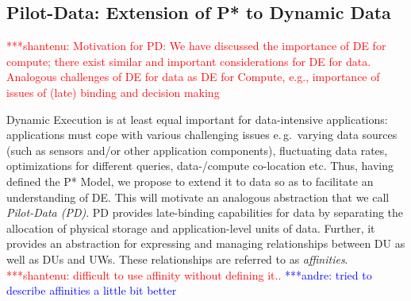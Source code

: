 \documentclass[conference,final]{IEEEtran}
\newcommand{\jhanote}[1]{ {\textcolor{red} { ***shantenu: #1 }}}
\newcommand{\alnote}[1]{ {\textcolor{blue} { ***andre: #1 }}}
\newcommand{\alnote}[1]{}
\newcommand{\jhanote}[1]{}
\begin{document}
\subsection{Pilot-Data: Extension of P* to Dynamic Data}
\label{sec:pilot-data}







\jhanote{Motivation for PD: We have discussed the importance of DE for
  compute; there exist similar and important considerations for DE for
  data. Analogous challenges of DE for data as DE for Compute, e.g.,
  importance of issues of (late) binding and decision making} 

Dynamic Execution is at least equal important for data-intensive applications:
applications must cope with various challenging issues e.\,g.\ varying data
sources (such as sensors and/or other application components), fluctuating data
rates, optimizations for different queries, data-/compute co-location etc. Thus,
having defined the P* Model, we propose to extend it to data so as to facilitate
an understanding of DE. This will motivate an analogous abstraction that we call
\emph{Pilot-Data (PD)}. PD provides late-binding capabilities for data by
separating the allocation of physical storage and application-level units of
data. Further, it provides an abstraction for expressing and managing
relationships between DU as well as DUs and UWs. These relationships are
referred to as
\emph{affinities}.
\jhanote{difficult to use affinity
  without defining it..}
\alnote{tried to describe affinities a little bit better}
\end{document}
